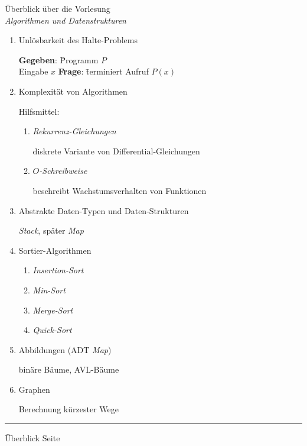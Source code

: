 \documentclass{slides}
\newcounter{mypage}
\begin{document}
\begin{slide}{}
 \begin{center}
Überblick \"uber die Vorlesung \\
 \textsl{Algorithmen und Datenstrukturen}
\end{center}

\footnotesize
\begin{enumerate}
\item Unl\"osbarkeit des Halte-Problems

      \begin{tabbing}
      \textbf{Gegeben}: \= Programm $P$ \\
                        \> Eingabe $x$
      \textbf{Frage}:   \= terminiert Aufruf $P(x)$
      \end{tabbing}
\item Komplexit\"at von Algorithmen

      Hilfsmittel:
      \begin{enumerate}
      \item \emph{Rekurrenz-Gleichungen} 

            diskrete Variante von Differential-Gleichungen
      \item \emph{$O$-Schreibweise} 

            beschreibt Wachstumsverhalten von Funktionen
      \end{enumerate}
\item Abstrakte Daten-Typen und Daten-Strukturen

      \textsl{Stack}, sp\"ater \textsl{Map} 
\item Sortier-Algorithmen
      \begin{enumerate}
      \item \emph{Insertion-Sort}
      \item \emph{Min-Sort}
      \item \emph{Merge-Sort}
      \item \emph{Quick-Sort}
      \end{enumerate}
\item Abbildungen (ADT \textsl{Map})
  
      bin\"are B\"aume, AVL-B\"aume
\item Graphen

      Berechnung k\"urzester Wege
\end{enumerate}

\vspace*{\fill}
\tiny \addtocounter{mypage}{1}
\rule{17cm}{1mm}
Überblick  \hspace*{\fill} Seite 
\end{slide}
\end{document}
